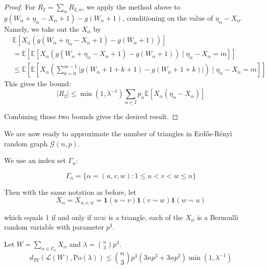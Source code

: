 \documentclass{article}
\begin{document}
\begin{proof}
    For $R_2=\sum_\alpha R_{2,\alpha}$, we apply the method above to $g(W_\alpha + \eta_\alpha - X_\alpha + 1) - g(W_\alpha + 1)$, conditioning on the value of $\eta_\alpha - X_\alpha$. Namely, we take out the $X_\alpha$ by
    \begin{align*}
        &\mathbb{E}[X_\alpha (g(W_\alpha + \eta_\alpha -X_\alpha +  1) - g(W_\alpha + 1))] \\
        &= \mathbb{E}[\mathbb{E}[X_\alpha (g(W_\alpha + \eta_\alpha -X_\alpha +  1) - g(W_\alpha + 1)) \mid \eta_\alpha - X_\alpha = m]] \\
        &\leq \mathbb{E}[\mathbb{E}[X_\alpha \left(\sum_{k=0}^{m-1} |g(W_\alpha + 1 + k+1) - g(W_\alpha + 1 + k)|\right) \mid \eta_\alpha - X_\alpha = m]]
    \end{align*}
    This gives the bound:
    \begin{equation*}
        |R_2| \leq \min (1, \lambda^{-1}) \sum_{\alpha \in I} p_\alpha \mathbb{E}[ X_\alpha (\eta_\alpha - X_\alpha)]
    \end{equation*}

    Combining those two bounds gives the desired result.
\end{proof}  

We are now ready to approximate the number of triangles in Erd\H{o}s-R\'{e}nyi random graph $\mathcal{G}(n,p)$.   

\medskip


We use an index set $\Gamma_n$:

\begin{equation*}
    \Gamma_{n}=\{\alpha=(u,v,w):1\leq u<v<w\leq n\}
\end{equation*}

Then with the same notation as before, let 
$$
X_{\alpha}=X_{u,v,w} = \mathbf{1}(u\sim v) \mathbf{1}(v\sim w) \mathbf{1}(w\sim u)
$$

which equals 1 if and only if $uvw$ is a triangle, each of the $X_\alpha$ is a Bernoulli random variable with parameter $p^3$. 

\begin{theorem}\label{thm:triangle_poisson_dependent}
    Let $W = \sum_{\alpha \in \Gamma_n} X_\alpha$ and $\lambda = \binom{n}{3}p^3$.
    \begin{equation*}
        d_{TV}(\mathcal{L}(W), \text{Po}(\lambda)) \leq \binom{n}{3}p^3(3np^3 + 3np^2) \min (1, \lambda^{-1})
    \end{equation*}
\end{theorem}
\end{document}

